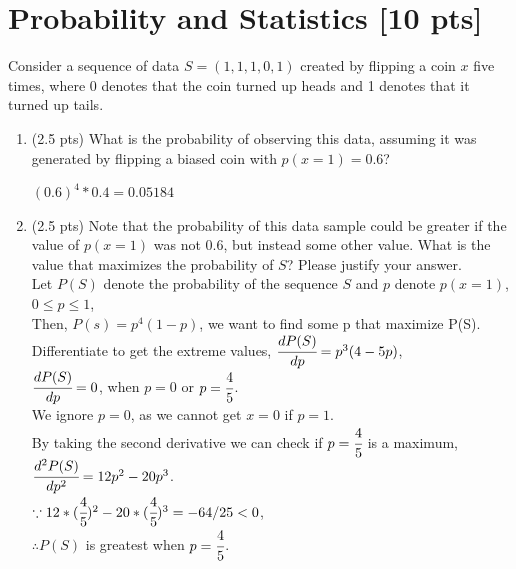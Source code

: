 \documentclass[a4paper]{article}
\theoremstyle{definition}
\newenvironment{soln}{
	\leavevmode\color{blue}\ignorespaces
}{}
\begin{document}
	
	
	
	\section{Probability and Statistics [10 pts]}
	Consider a sequence of data $S = (1, 1, 1, 0, 1)$ created by flipping a coin $x$ five times, where 0 denotes that the coin turned up heads and 1 denotes that it turned up tails.
	\begin{enumerate}
		\item 	(2.5 pts) What is the probability of observing this data, assuming it was generated by flipping a biased coin with $p(x=1) = 0.6$?
		
		\begin{soln} $ (0.6)^{4} * 0.4 = 0.05184 $ \end{soln}
		
		\item 	(2.5 pts) Note that the probability of this data sample could be greater if the value of $p(x = 1)$ was not $0.6$, but instead some other value. What is the value that maximizes the probability of $S$? Please justify your answer.\\
		\begin{soln}  Let $ P(S) $ denote the probability of the sequence $ S $ and $ p $ denote $ p(x=1) $, $ 0 \leq p \leq 1 $, \\ Then, $ P(s) = p^{4}(1-p) $, we want to find some p that maximize P(S). \\ Differentiate to get the extreme values, $ \cfrac{dP(S)}{dp} = p^{3}(4-5p) $, \\ $ \cfrac{dP(S)}{dp} = 0 $, when $p = 0 $ or $ p = \cfrac{4}{5} $. \\ We ignore $ p = 0 $, as we cannot get $ x = 0 $ if $ p = 1 $. \\ By taking the second derivative we can check if $ p = \cfrac{4}{5} $ is a maximum, $\cfrac{d^{2}P(S)}{dp^{2}} = 12p^{2} - 20p^{3} $. \\ $\because 12*(\cfrac{4}{5})^{2} - 20*(\cfrac{4}{5})^{3} = -64/25 < 0 $, \\ $  \therefore P(S) $ is greatest when $ p = \cfrac{4}{5} $.  \end{soln}
		

\end{enumerate}
\end{document}
